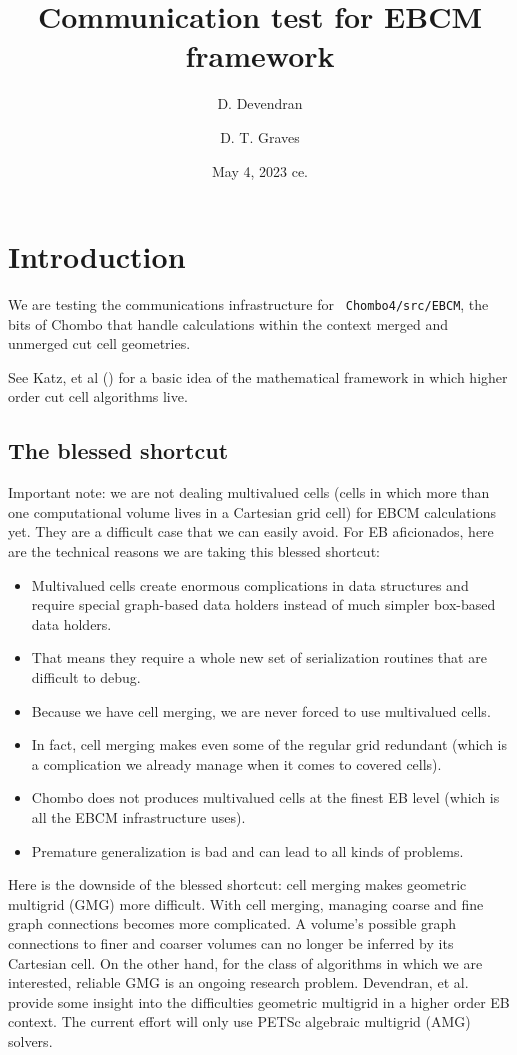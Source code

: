 \documentclass{article}
\begin{document}
\title{Communication test for EBCM framework}
\author{
    D. Devendran   \footnotemark[2] \and
    D. T. Graves    \footnotemark[1]
        }
\date{May 4, 2023 ce.}
\maketitle

\section{Introduction}

We are testing the communications infrastructure for {\tt
Chombo4/src/EBCM}, the bits of Chombo that handle calculations
within the context merged and
unmerged cut cell geometries.   

See Katz, et al (\cite{Katz2023}) for a basic idea of the mathematical
framework in which higher order cut cell algorithms live.

\subsection{The blessed shortcut}

Important note: we are not dealing multivalued cells (cells in which
more than one computational volume lives in a Cartesian grid cell) for
EBCM calculations yet.  They are a difficult case that we can easily
avoid.  For EB aficionados, here are the technical reasons we are
taking this blessed shortcut:
\begin{itemize}
  \item Multivalued cells create enormous complications in data
    structures and require special graph-based data holders instead of
    much simpler box-based data holders.
 \item That means they require a whole new set of serialization
   routines that are difficult to debug.   
 \item Because we have cell merging, we are never forced to use
   multivalued cells.
 \item In fact, cell merging makes even some of the
   regular grid redundant (which is a complication we already manage
   when it comes to covered cells).
 \item Chombo does not produces multivalued cells at the finest EB
   level (which is all the EBCM infrastructure uses).
 \item Premature generalization is bad and can lead to all kinds of
   problems.   
\end{itemize}
Here is the downside of the blessed shortcut: cell merging makes
geometric multigrid (GMG) more difficult.  With cell merging, managing
coarse and fine graph connections becomes more complicated. A volume's
possible graph connections to finer and coarser volumes can no longer
be inferred by its Cartesian cell. On the other hand, for the class of
algorithms in which we are interested, reliable GMG is an ongoing
research problem.  Devendran, et al. \cite{Devendran2014}
provide some insight into the difficulties geometric multigrid in a
higher order EB context.  The current effort will only use PETSc
\cite{petsc-user-ref, petsc-efficient} algebraic multigrid (AMG)
solvers.
\end{document}
